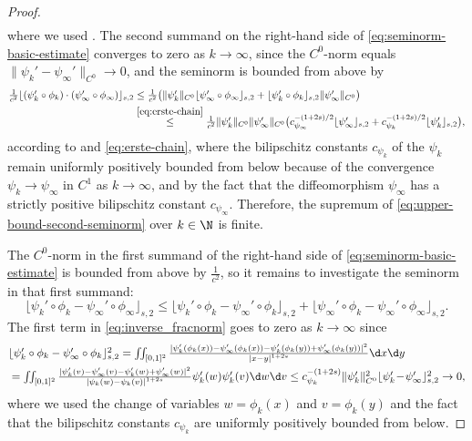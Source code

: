 \begin{proof}
\begin{align}
		\end{align}
where we used \cite[Proposition A.5]{knappmann-etal_2023}.
The second summand on the right-hand side of 
\cref{eq:seminorm-basic-estimate} converges to zero as $k\to\infty$, 
since the $C^0$-norm equals $\|\psi_k'-\psi_\infty'\|_{C^0}\to 0$, and
the seminorm is bounded from above by 
\begin{align}\label{eq:upper-bound-second-seminorm}
\textstyle
\frac1{c^2}\lfloor(\psi_k'\circ\phi_k)
\cdot (\psi_\infty'\circ\phi_\infty)\rfloor_{s,2}&
\textstyle
\le\frac1{c^2}\big(
\|\psi_k'\|_{C^0}\lfloor\psi_\infty'\circ\phi_\infty\rfloor_{s,2}+
\lfloor\psi_k'\circ\phi_k\rfloor_{s,2}\|\psi_\infty'\|_{C^0}\big)\\
&
\textstyle
\overset{\cref{eq:erste-chain}}{\le}
\frac1{c^2}\|\psi_k'\|_{C^0}\|\psi_\infty'\|_{C^0}
\big(c_{\psi_\infty}^{-(1+2s)/2}
\lfloor\psi_\infty'\rfloor_{s,2}+
c_{\psi_k}^{-(1+2s)/2}
\lfloor\psi_k'\rfloor_{s,2}\big),\notag
\end{align}
according
to \cite[Lemma A.6]{knappmann-etal_2023} and \cref{eq:erste-chain}, where the 
bilipschitz constants $c_{\psi_k}$ of the $\psi_k$ remain
uniformly positively bounded from below because of the convergence
$\psi_k\to\psi_\infty$ in $C^1$ as $k\to\infty$, and by
the fact that the
diffeomorphism $\psi_\infty$ has a strictly positive bilipschitz
constant $c_{\psi_\infty}$. Therefore, the supremum of 
 \cref{eq:upper-bound-second-seminorm} over $k\in\N$ is finite.

The $C^0$-norm in the first summand of the right-hand side
of \cref{eq:seminorm-basic-estimate} is bounded from above by 
$\frac{1}{c^2}$,
so
it remains to investigate the seminorm in that first summand:   
\begin{equation}
\label{eq:inverse_fracnorm}
\lfloor\psi_k'\circ\phi_k-\psi_\infty'\circ\phi_\infty\rfloor_{s,2}
\le\lfloor\psi_k'\circ\phi_k-\psi_\infty'\circ\phi_k\rfloor_{s,2}+
\lfloor\psi_\infty'\circ\phi_k-\psi_\infty'\circ\phi_\infty\rfloor_{s,2}.
\end{equation}
The first term in \cref{eq:inverse_fracnorm}
goes to zero as $k\to\infty$ since 
\begin{align*}
&\textstyle
\lfloor\psi'_{k}\circ\phi_k-\psi_\infty'\circ\phi_k\rfloor_{s,2}^2
=\iint_{[0,1]^2}\frac{|\psi'_{k}(\phi_k(x))-\psi_\infty'(\phi_k(x))
-\psi'_{k}(\phi_k(y))+\psi_\infty'(\phi_k(y))|^2}{\left|x-y \right|^{1+2s}}\d x\d y \\
&
\textstyle
= \iint_{[0,1]^2}\frac{|\psi'_{k}(v)-\psi_\infty'(v)-\psi'_{k}(w)
+\psi_\infty'(w)|^2}{\left|\psi_k(w)-\psi_k(v) \right|^{1+2s}} 
\psi'_{k}(w) \psi'_{k}(v)\d w\d v
\le c_{\psi_k}^{-(1+2s)}\|\psi'_k \|^2_{C^0}
\lfloor \psi_k'\!-\!\psi_\infty'\rfloor_{s,2}^2
\to 0,
\end{align*}
where we used the 
change of variables $w=\phi_k(x)$ and 
$v=\phi_k(y)$ and the fact that the bilipschitz constants $c_{\psi_k}$
are uniformly positively bounded from below.


\end{proof}

